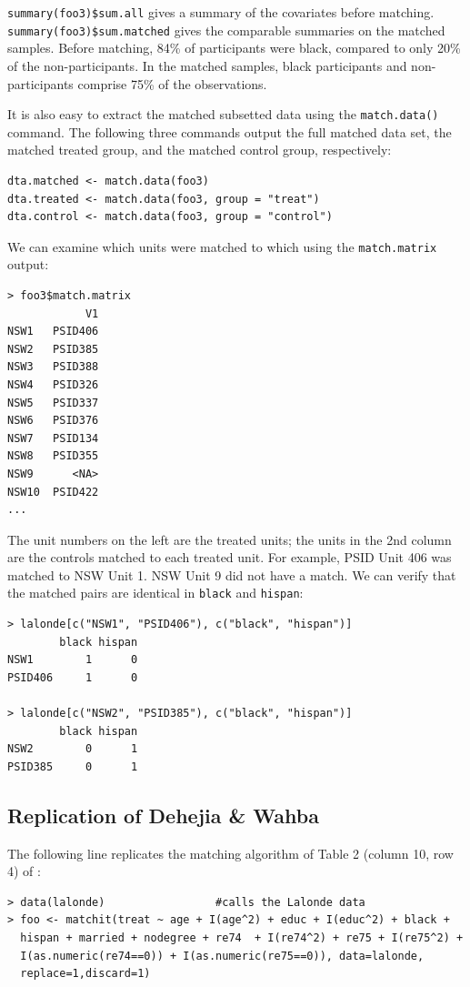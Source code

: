 \documentclass[oneside,letterpaper,titlepage]{article}
\begin{document}
{\tt summary(foo3)\$sum.all} gives a summary of the covariates before matching.  {\tt summary(foo3)\$sum.matched} gives
the comparable summaries on the matched samples. Before matching, 84\% of participants were black, compared to only
20\% of the non-participants.  In the matched samples, black participants
and non-participants comprise 75\% of the observations. 

It is also easy to extract the matched subsetted data using the {\tt match.data()} command.  The following three commands output the full matched data set,
the matched treated group, and the matched control group, respectively: 

\begin{verbatim}
dta.matched <- match.data(foo3)
dta.treated <- match.data(foo3, group = "treat")
dta.control <- match.data(foo3, group = "control")
\end{verbatim}

We can examine which units were matched to which using the {\tt match.matrix} output:
\begin{verbatim}
> foo3$match.matrix
            V1
NSW1   PSID406
NSW2   PSID385
NSW3   PSID388
NSW4   PSID326
NSW5   PSID337
NSW6   PSID376
NSW7   PSID134
NSW8   PSID355
NSW9      <NA>
NSW10  PSID422
...  
\end{verbatim}

The  unit numbers on the left are the treated units; the units in the 2nd column are the controls matched to each treated unit.  For example, PSID Unit 406 was
matched to NSW Unit 1.  NSW Unit 9 did not have a match.  
We can verify that the matched pairs are identical
in \texttt{black} and \texttt{hispan}:

\begin{verbatim}
> lalonde[c("NSW1", "PSID406"), c("black", "hispan")]
        black hispan
NSW1        1      0
PSID406     1      0

> lalonde[c("NSW2", "PSID385"), c("black", "hispan")]
        black hispan
NSW2        0      1
PSID385     0      1
\end{verbatim}


\subsection{Replication of Dehejia \& Wahba}

The following line replicates the matching algorithm of Table 2
(column 10, row 4) of \citet{DehWah99}:

\begin{verbatim}
> data(lalonde)                 #calls the Lalonde data
> foo <- matchit(treat ~ age + I(age^2) + educ + I(educ^2) + black +
  hispan + married + nodegree + re74  + I(re74^2) + re75 + I(re75^2) +
  I(as.numeric(re74==0)) + I(as.numeric(re75==0)), data=lalonde,
  replace=1,discard=1)
\end{verbatim}
\end{document}
